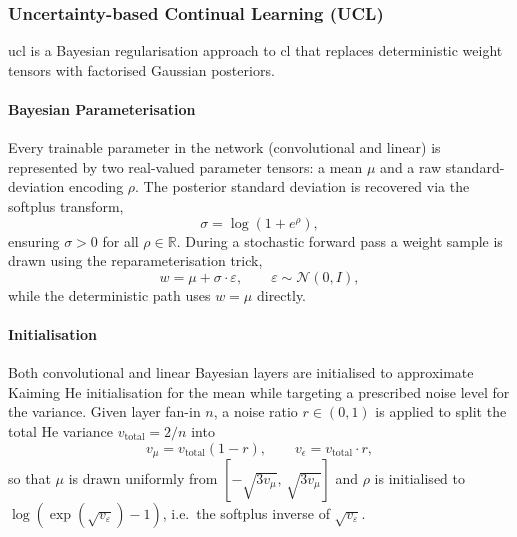 \subsubsection{Uncertainty-based Continual Learning (UCL)}

\gls{ucl} \cite{ll_ucl_2019} is a Bayesian regularisation approach to \gls{cl} that replaces deterministic weight tensors with factorised Gaussian posteriors.

\paragraph{Bayesian Parameterisation}

Every trainable parameter in the network (convolutional and linear) is represented by two real-valued parameter tensors: a mean $\mu$ and a raw standard-deviation encoding $\rho$. The posterior standard deviation is recovered via the softplus transform,
%
\begin{equation}\label{eqn:ucl_sigma}
    \sigma = \log\!\left(1 + e^{\rho}\right),
\end{equation}
%
ensuring $\sigma > 0$ for all $\rho \in \mathbb{R}$. During a stochastic forward pass a weight sample is drawn using the reparameterisation trick,
%
\begin{equation}\label{eqn:ucl_reparam}
    w = \mu + \sigma \cdot \varepsilon,
    \qquad
    \varepsilon \sim \mathcal{N}(0, I),
\end{equation}
%
while the deterministic path uses $w = \mu$ directly.

\paragraph{Initialisation}

Both convolutional and linear Bayesian layers are initialised to approximate Kaiming He initialisation for the mean while targeting a prescribed noise level for the variance. Given layer fan-in $n$, a noise ratio $r \in (0,1)$ is applied to split the total He variance $v_\text{total} = 2/n$ into
%
\begin{equation}\label{eqn:ucl_init}
    v_\mu = v_\text{total}(1-r),
    \qquad
    v_\epsilon = v_\text{total} \cdot r,
\end{equation}
%
so that $\mu$ is drawn uniformly from $[-\sqrt{3 v_\mu},\, \sqrt{3 v_\mu}]$ and $\rho$ is initialised to $\log(\exp(\sqrt{v_\varepsilon}) - 1)$, i.e.\ the softplus inverse of $\sqrt{v_\varepsilon}$.


